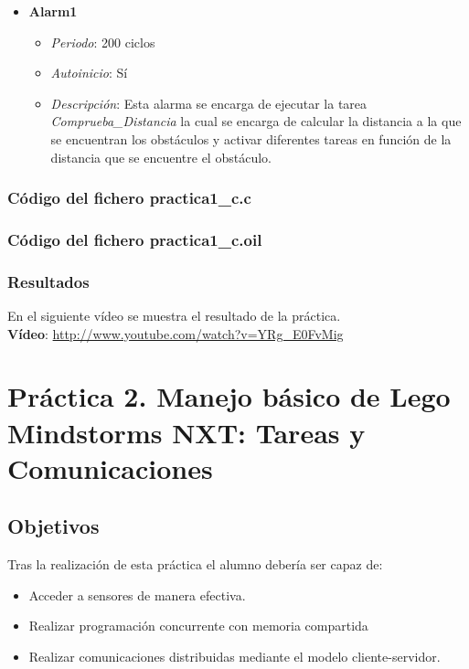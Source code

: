 \begin{itemize}
	\item \textbf{Alarm1}
		\begin{itemize}
			\item \textit{Periodo}: 200 ciclos
			\item \textit{Autoinicio}: Sí
			\item \textit{Descripción}: Esta alarma se encarga de ejecutar la tarea \textit{Comprueba\_Distancia} la cual se encarga de calcular la distancia a la que se encuentran los obstáculos y activar diferentes tareas en función de la distancia que se encuentre el obstáculo.
		\end{itemize}
\end{itemize}
\subsection{Código del fichero practica1\_c.c}


\subsection{Código del fichero practica1\_c.oil}


\subsection{Resultados}
En el siguiente vídeo se muestra el resultado de la práctica.\\

\textbf{Vídeo}:  \url{http://www.youtube.com/watch?v=YRg_E0FvMig}

\chapter{Práctica 2. Manejo básico de Lego Mindstorms NXT: Tareas y Comunicaciones}

\section{Objetivos}
Tras la realización de esta práctica el alumno debería ser capaz de:
\begin{itemize}
	\item Acceder a sensores de manera efectiva.
	\item Realizar programación concurrente con memoria compartida
	\item Realizar comunicaciones distribuidas mediante el modelo cliente-servidor.
\end{itemize}


